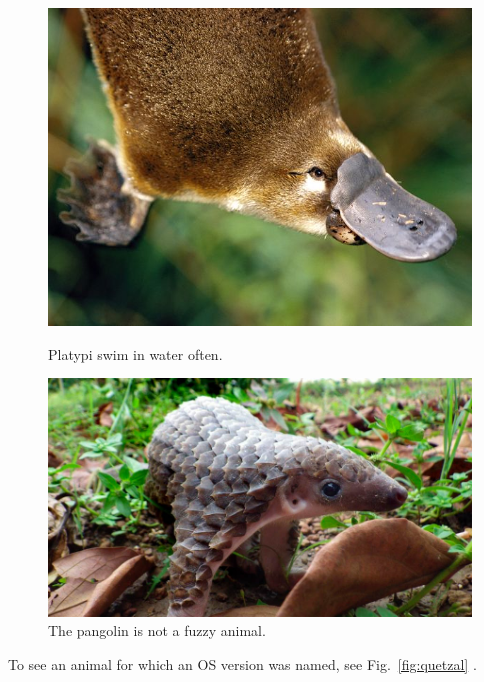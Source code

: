 \begin{figure}[ht] \centering
    \begin{minipage}[b]{0.45\linewidth} \centering 
        \includegraphics[width=\textwidth]{./figs/a_cute_platypus.jpg}
        \caption{Platypi swim in water often.} \label{fig:platypus}
    \end{minipage}
    \hspace{0.5cm}
    \begin{minipage}[b]{0.45\linewidth} \centering
        \includegraphics[width=\textwidth]{./figs/an_adorable_pangolin.jpg}
        \caption{The pangolin is not a fuzzy animal.} \label{fig:pangolin}
    \end{minipage}
\end{figure}

To see an animal for which an OS version was named, see Fig.~\ref{fig:quetzal} .

\lipsum[3]